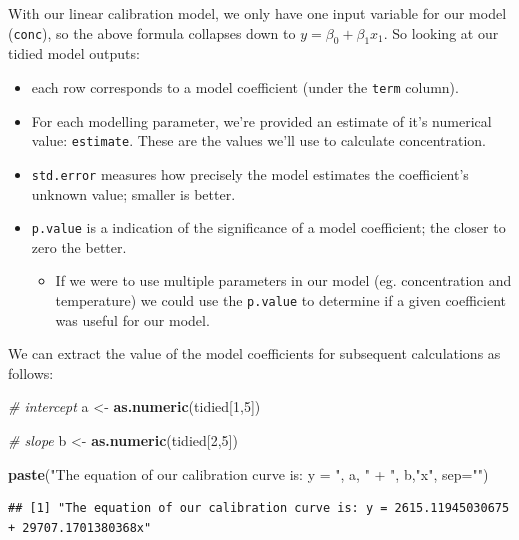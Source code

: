 \documentclass[
]{book}
\newenvironment{Shaded}{\begin{snugshade}}{\end{snugshade}}
\newcommand{\AttributeTok}[1]{\textcolor[rgb]{0.13,0.29,0.53}{#1}}
\newcommand{\CommentTok}[1]{\textcolor[rgb]{0.56,0.35,0.01}{\textit{#1}}}
\newcommand{\DecValTok}[1]{\textcolor[rgb]{0.00,0.00,0.81}{#1}}
\newcommand{\FunctionTok}[1]{\textcolor[rgb]{0.13,0.29,0.53}{\textbf{#1}}}
\newcommand{\NormalTok}[1]{#1}
\newcommand{\OtherTok}[1]{\textcolor[rgb]{0.56,0.35,0.01}{#1}}
\newcommand{\StringTok}[1]{\textcolor[rgb]{0.31,0.60,0.02}{#1}}
\providecommand{\tightlist}{%
  \setlength{\itemsep}{0pt}\setlength{\parskip}{0pt}}
\begin{document}
With our linear calibration model, we only have one input variable for our model (\texttt{conc}), so the above formula collapses down to \(y = \beta _{0} + \beta _{1} x_{1}\). So looking at our tidied model outputs:

\begin{itemize}
\tightlist
\item
  each row corresponds to a model coefficient (under the \texttt{term} column).
\item
  For each modelling parameter, we're provided an estimate of it's numerical value: \texttt{estimate}. These are the values we'll use to calculate concentration.
\item
  \texttt{std.error} measures how precisely the model estimates the coefficient's unknown value; smaller is better.
\item
  \texttt{p.value} is a indication of the significance of a model coefficient; the closer to zero the better.

  \begin{itemize}
  \tightlist
  \item
    If we were to use multiple parameters in our model (eg. concentration and temperature) we could use the \texttt{p.value} to determine if a given coefficient was useful for our model.
  \end{itemize}
\end{itemize}

We can extract the value of the model coefficients for subsequent calculations as follows:

\begin{Shaded}
\begin{Highlighting}[]
\CommentTok{\# intercept}
\NormalTok{a }\OtherTok{\textless{}{-}} \FunctionTok{as.numeric}\NormalTok{(tidied[}\DecValTok{1}\NormalTok{,}\DecValTok{5}\NormalTok{])}

\CommentTok{\# slope }
\NormalTok{b }\OtherTok{\textless{}{-}} \FunctionTok{as.numeric}\NormalTok{(tidied[}\DecValTok{2}\NormalTok{,}\DecValTok{5}\NormalTok{])}

\FunctionTok{paste}\NormalTok{(}\StringTok{"The equation of our calibration curve is: y = "}\NormalTok{, a, }\StringTok{" + "}\NormalTok{, b,}\StringTok{"x"}\NormalTok{, }\AttributeTok{sep=}\StringTok{""}\NormalTok{)}
\end{Highlighting}
\end{Shaded}

\begin{verbatim}
## [1] "The equation of our calibration curve is: y = 2615.11945030675 + 29707.1701380368x"
\end{verbatim}
\end{document}
